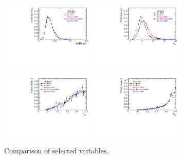 \begin{figure}[h]
\includegraphics[height=!,width=0.4\textwidth]{figs/dataVsMC/norm2signal/Ds2all_Bs_DTF_TAUERR.pdf}
\includegraphics[height=!,width=0.4\textwidth]{figs/dataVsMC/norm2signal/Ds2all_Bs_DTF_MERR.pdf}

\includegraphics[height=!,width=0.4\textwidth]{figs/dataVsMC/norm2signal/Ds2all_Bs_TAGOMEGA_OS.pdf}
\includegraphics[height=!,width=0.4\textwidth]{figs/dataVsMC/norm2signal/Ds2all_Bs_SS_nnetKaon_PROB.pdf}


\caption{Comparison of selected variables.}
\label{fig:}
\end{figure}

